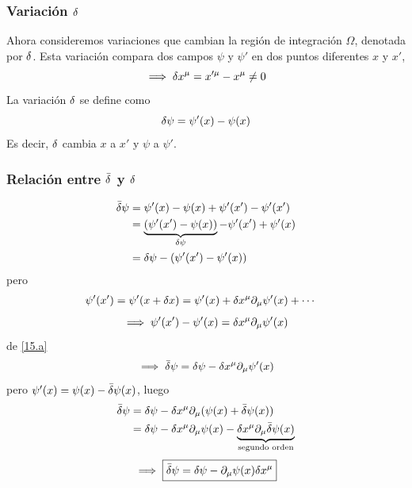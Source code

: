 \subsubsection{Variación $\delta$}
Ahora consideremos variaciones que cambian la región de integración $\Omega$, denotada por $\delta$. Esta variación compara dos campos $\psi$ y $\psi'$ en dos puntos diferentes $x$ y $x'$,
\begin{equation}
  \implies \delta x^\mu =x'^\mu -x^\mu \neq 0
\end{equation}
La variación $\delta$ se define como
\begin{equation}
  \delta\psi=\psi'(x)-\psi(x)
\end{equation}
Es decir, $\delta$ cambia $x$ a $x'$ y $\psi$ a $\psi'$. 

\subsubsection{Relación entre $\bar{\delta}$ y $\delta$}
\begin{align}
  \bar{\delta}\psi &=\psi'(x)-\psi(x) + \psi'(x')-\psi'(x')\\
  &=\underbrace{(\psi'(x')-\psi(x))}_{\delta\psi}-\psi'(x')+\psi'(x)\\
  &=\delta\psi - (\psi'(x')-\psi'(x))\label{15.a}
\end{align}
pero
\begin{align}
  \psi'(x')&=\psi'(x+\delta x)=\psi'(x)+\delta x^\mu \partial_\mu \psi'(x)+\cdots 
\end{align}
\begin{equation}
  \implies \psi'(x')-\psi'(x)=\delta x^\mu \partial_\mu \psi'(x)
\end{equation}
de \eqref{15.a}
\begin{equation}
  \implies \bar{\delta}\psi =\delta\psi -\delta x^\mu \partial_\mu \psi'(x)
\end{equation}
pero $\psi'(x)=\psi(x)-\bar{\delta}\psi(x)$, luego
\begin{align}
  \bar{\delta} \psi&=\delta\psi-\delta x^\mu \partial_\mu (\psi(x)+\bar{\delta}\psi(x))\\
  &=\delta\psi -\delta x^\mu \partial_\mu \psi(x)-\underbrace{\delta x^\mu \partial_\mu \bar{\delta} \psi(x)}_{\text{segundo orden}}
\end{align}
\begin{equation}
  \implies\boxed{ \bar{\delta}\psi=\delta\psi-\partial_\mu \psi(x)\delta x^\mu }
\end{equation}

